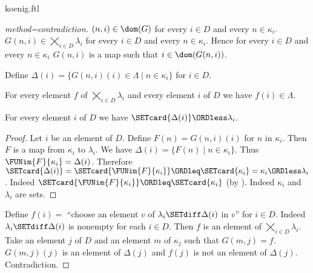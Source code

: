 \documentclass{stex}
\newcommand{\ProdSet}[2]{\bigtimes_{i \in #2} #1_{i}}
\begin{document}
\begin{smodule}{koenig.ftl}
\begin{forthel}
\begin{proof}[method=contradiction]
    $(n,i) \in \dom(G)$ for every $i \in D$ and every $n \in \kappa_{i}$.
    $G(n,i) \in \ProdSet{\lambda}{D}$ for every $i \in D$ and every $n \in \kappa_{i}$.
    Hence for every $i \in D$ and every $n \in \kappa_{i}$ $G(n,i)$ is a map such that $i \in \dom(G(n,i))$.

    Define $\Delta(i) = \{ G(n,i)(i) \in \Lambda \mid n \in \kappa_{i} \}$ for $i \in D$.

    For every element $f$ of $\ProdSet{\lambda}{D}$ and every element $i$ of $D$ we have $f(i) \in \Lambda$.

    For every element $i$ of $D$ we have $\SETcard{\Delta(i)} \ORDless \lambda_{i}$.
    \begin{proof}
      Let $i$ be an element of $D$.
      Define $F(n) = G(n,i)(i)$ for $n$ in $\kappa_{i}$.
      Then $F$ is a map from $\kappa_{i}$ to $\lambda_{i}$.
      We have $\Delta(i) = \{ F(n) \mid n \in \kappa_{i} \}$.
      Thus $\FUNim{F}{\kappa_{i}} = \Delta(i)$.
      Therefore $\SETcard{\Delta(i)}
        = \SETcard{\FUNim{F}{\kappa_{i}}}
        \ORDleq \SETcard{\kappa_{i}}
        = \kappa_{i}
        \ORDless \lambda_{i}$.
      Indeed $\SETcard{\FUNim{F}{\kappa_{i}}} \ORDleq \SETcard{\kappa_{i}}$ (by ).
      Indeed $\kappa_{i}$ and $\lambda_{i}$ are sets.
    \end{proof}

    Define $f(i) =$ ``choose an element $v$ of $\lambda_{i} \SETdiff \Delta(i)$ in $v$'' for $i \in D$.
    Indeed $\lambda_{i} \SETdiff \Delta(i)$ is nonempty for each $i \in D$.
    Then $f$ is an element of $\ProdSet{\lambda}{D}$.
    Take an element $j$ of $D$ and an element $m$ of $\kappa_{j}$ such that $G(m,j) = f$.
    $G(m,j)(j)$ is an element of $\Delta(j)$ and $f(j)$ is not an element of $\Delta(j)$.
    Contradiction.
  \end{proof}
\end{forthel}

\printbibliography
{}
\end{smodule}
\end{document}
